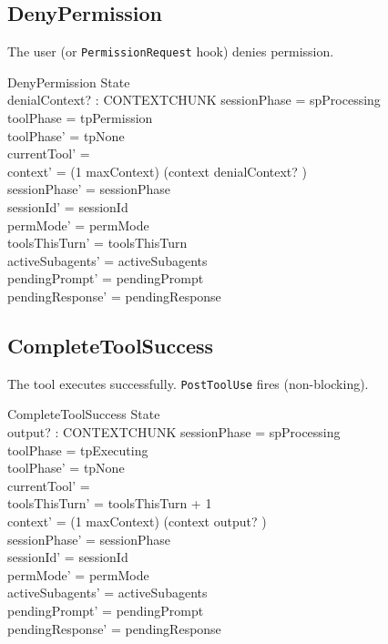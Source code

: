\documentclass[a4paper,10pt,fleqn]{article}
\begin{document}
\subsection{DenyPermission}

The user (or \texttt{PermissionRequest} hook) denies permission.

\begin{schema}{DenyPermission}
  \Delta State \\
  denialContext? : CONTEXTCHUNK
  \where
  sessionPhase = spProcessing \\
  toolPhase = tpPermission \\
  toolPhase' = tpNone \\
  currentTool' = \emptyset \\
  context' = (1 \upto maxContext) \dres (context \cat \langle denialContext? \rangle) \\
  sessionPhase' = sessionPhase \\
  sessionId' = sessionId \\
  permMode' = permMode \\
  toolsThisTurn' = toolsThisTurn \\
  activeSubagents' = activeSubagents \\
  pendingPrompt' = pendingPrompt \\
  pendingResponse' = pendingResponse
\end{schema}

\subsection{CompleteToolSuccess}

The tool executes successfully. \texttt{PostToolUse} fires (non-blocking).

\begin{schema}{CompleteToolSuccess}
  \Delta State \\
  output? : CONTEXTCHUNK
  \where
  sessionPhase = spProcessing \\
  toolPhase = tpExecuting \\
  toolPhase' = tpNone \\
  currentTool' = \emptyset \\
  toolsThisTurn' = toolsThisTurn + 1 \\
  context' = (1 \upto maxContext) \dres (context \cat \langle output? \rangle) \\
  sessionPhase' = sessionPhase \\
  sessionId' = sessionId \\
  permMode' = permMode \\
  activeSubagents' = activeSubagents \\
  pendingPrompt' = pendingPrompt \\
  pendingResponse' = pendingResponse
\end{schema}
\end{document}
